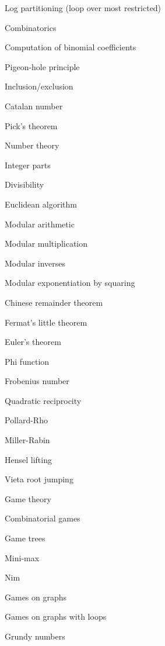 \begin{myitemize}
\begin{myitemize}
	\item Log partitioning (loop over most restricted)
\end{myitemize}
\item Combinatorics
\begin{myitemize}
	\item Computation of binomial coefficients
	\item Pigeon-hole principle
	\item Inclusion/exclusion
	\item Catalan number
	\item Pick's theorem
\end{myitemize}
\item Number theory
\begin{myitemize}
	\item Integer parts
	\item Divisibility
	\item Euclidean algorithm
	\item Modular arithmetic
	\begin{myitemize}
		\item Modular multiplication
		\item Modular inverses
		\item Modular exponentiation by squaring
	\end{myitemize}
	\item Chinese remainder theorem
	\item Fermat's little theorem
	\item Euler's theorem
	\item Phi function
	\item Frobenius number
	\item Quadratic reciprocity
	\item Pollard-Rho
	\item Miller-Rabin
	\item Hensel lifting
	\item Vieta root jumping
\end{myitemize}
\item Game theory
\begin{myitemize}
	\item Combinatorial games
	\item Game trees
	\item Mini-max
	\item Nim
	\item Games on graphs
	\item Games on graphs with loops
	\item Grundy numbers

\end{myitemize}
\end{myitemize}
